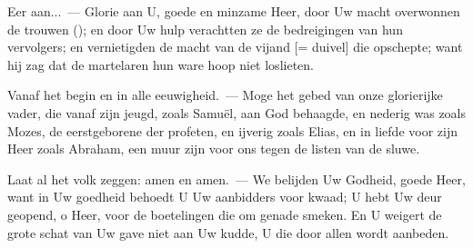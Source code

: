 \documentclass[12pt,twoside,a5paper]{article}
\begin{document}
\begin{halfparskip}
  Eer aan...~--- Glorie aan U, goede en minzame Heer, door Uw macht overwonnen de trouwen (); en door Uw hulp verachtten ze de bedreigingen van hun vervolgers; en vernietigden de macht van de vijand [= duivel] die opschepte; want hij zag dat de martelaren hun ware hoop niet loslieten.

  Vanaf het begin en in alle eeuwigheid.~--- Moge het gebed van onze glorierijke vader, die vanaf zijn jeugd, zoals Samuël, aan God behaagde, en nederig was zoals Mozes, de eerstgeborene der profeten, en ijverig zoals Elias, en in liefde voor zijn Heer zoals Abraham, een muur zijn voor ons tegen de listen van de sluwe.

  Laat al het volk zeggen: amen en amen.~--- We belijden Uw Godheid, goede Heer, want in Uw goedheid behoedt U Uw aanbidders voor kwaad; U hebt Uw deur geopend, o Heer, voor de boetelingen die om genade smeken. En U weigert de grote schat van Uw gave niet aan Uw kudde, U die door allen wordt aanbeden.
\end{halfparskip}
\end{document}
